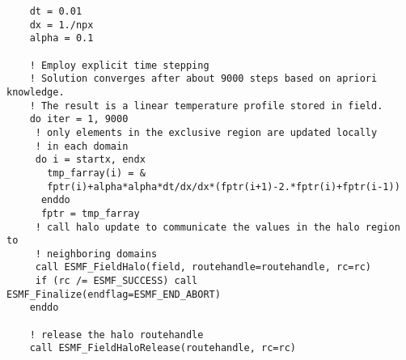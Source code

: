 \begin{verbatim}
    dt = 0.01
    dx = 1./npx
    alpha = 0.1

    ! Employ explicit time stepping
    ! Solution converges after about 9000 steps based on apriori knowledge.
    ! The result is a linear temperature profile stored in field.
    do iter = 1, 9000
     ! only elements in the exclusive region are updated locally
     ! in each domain
     do i = startx, endx
       tmp_farray(i) = &
       fptr(i)+alpha*alpha*dt/dx/dx*(fptr(i+1)-2.*fptr(i)+fptr(i-1))
      enddo
      fptr = tmp_farray
     ! call halo update to communicate the values in the halo region to
     ! neighboring domains
     call ESMF_FieldHalo(field, routehandle=routehandle, rc=rc)
     if (rc /= ESMF_SUCCESS) call ESMF_Finalize(endflag=ESMF_END_ABORT)
    enddo

    ! release the halo routehandle
    call ESMF_FieldHaloRelease(routehandle, rc=rc)
 
\end{verbatim}

\setlength{\parskip}{\oldparskip}
\setlength{\parindent}{\oldparindent}
\setlength{\baselineskip}{\oldbaselineskip}

